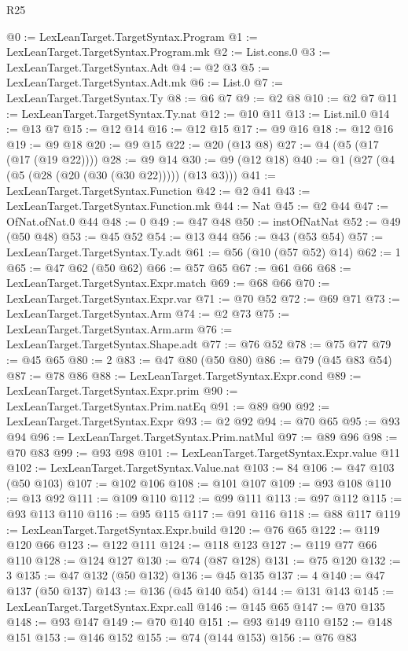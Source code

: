 \begin{lexlean}{R25}
\begin{coremodule}
@0 := LexLeanTarget.TargetSyntax.Program
@1 := LexLeanTarget.TargetSyntax.Program.mk
@2 := List.cons.{0}
@3 := LexLeanTarget.TargetSyntax.Adt
@4 := @2 @3
@5 := LexLeanTarget.TargetSyntax.Adt.mk
@6 := List.{0}
@7 := LexLeanTarget.TargetSyntax.Ty
@8 := @6 @7
@9 := @2 @8
@10 := @2 @7
@11 := LexLeanTarget.TargetSyntax.Ty.nat
@12 := @10 @11
@13 := List.nil.{0}
@14 := @13 @7
@15 := @12 @14
@16 := @12 @15
@17 := @9 @16
@18 := @12 @16
@19 := @9 @18
@20 := @9 @15
@22 := @20 (@13 @8)
@27 := @4 (@5 (@17 (@17 (@19 @22))))
@28 := @9 @14
@30 := @9 (@12 @18)
@40 := @1 (@27 (@4 (@5 (@28 (@20 (@30 (@30 @22))))) (@13 @3)))
@41 := LexLeanTarget.TargetSyntax.Function
@42 := @2 @41
@43 := LexLeanTarget.TargetSyntax.Function.mk
@44 := Nat
@45 := @2 @44
@47 := OfNat.ofNat.{0} @44
@48 := 0
@49 := @47 @48
@50 := instOfNatNat
@52 := @49 (@50 @48)
@53 := @45 @52
@54 := @13 @44
@56 := @43 (@53 @54)
@57 := LexLeanTarget.TargetSyntax.Ty.adt
@61 := @56 (@10 (@57 @52) @14)
@62 := 1
@65 := @47 @62 (@50 @62)
@66 := @57 @65
@67 := @61 @66
@68 := LexLeanTarget.TargetSyntax.Expr.match
@69 := @68 @66
@70 := LexLeanTarget.TargetSyntax.Expr.var
@71 := @70 @52
@72 := @69 @71
@73 := LexLeanTarget.TargetSyntax.Arm
@74 := @2 @73
@75 := LexLeanTarget.TargetSyntax.Arm.arm
@76 := LexLeanTarget.TargetSyntax.Shape.adt
@77 := @76 @52
@78 := @75 @77
@79 := @45 @65
@80 := 2
@83 := @47 @80 (@50 @80)
@86 := @79 (@45 @83 @54)
@87 := @78 @86
@88 := LexLeanTarget.TargetSyntax.Expr.cond
@89 := LexLeanTarget.TargetSyntax.Expr.prim
@90 := LexLeanTarget.TargetSyntax.Prim.natEq
@91 := @89 @90
@92 := LexLeanTarget.TargetSyntax.Expr
@93 := @2 @92
@94 := @70 @65
@95 := @93 @94
@96 := LexLeanTarget.TargetSyntax.Prim.natMul
@97 := @89 @96
@98 := @70 @83
@99 := @93 @98
@101 := LexLeanTarget.TargetSyntax.Expr.value @11
@102 := LexLeanTarget.TargetSyntax.Value.nat
@103 := 84
@106 := @47 @103 (@50 @103)
@107 := @102 @106
@108 := @101 @107
@109 := @93 @108
@110 := @13 @92
@111 := @109 @110
@112 := @99 @111
@113 := @97 @112
@115 := @93 @113 @110
@116 := @95 @115
@117 := @91 @116
@118 := @88 @117
@119 := LexLeanTarget.TargetSyntax.Expr.build
@120 := @76 @65
@122 := @119 @120 @66
@123 := @122 @111
@124 := @118 @123
@127 := @119 @77 @66 @110
@128 := @124 @127
@130 := @74 (@87 @128)
@131 := @75 @120
@132 := 3
@135 := @47 @132 (@50 @132)
@136 := @45 @135
@137 := 4
@140 := @47 @137 (@50 @137)
@143 := @136 (@45 @140 @54)
@144 := @131 @143
@145 := LexLeanTarget.TargetSyntax.Expr.call
@146 := @145 @65
@147 := @70 @135
@148 := @93 @147
@149 := @70 @140
@151 := @93 @149 @110
@152 := @148 @151
@153 := @146 @152
@155 := @74 (@144 @153)
@156 := @76 @83

\end{coremodule}
\end{lexlean}
